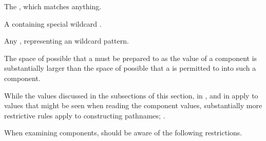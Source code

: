 \itemitem{\bull} The  , which matches anything.
 
\itemitem{\bull} A  containing  
		 special wildcard .
 
\itemitem{\bull} Any ,
		 representing an  wildcard pattern.

\endlist 

\endsubsubsection%


  
The space of possible  that a  
must be prepared to  
as the value of a  component
is substantially larger than the space of possible  
that a  is permitted to 
into such a component.

While the values discussed 
    in the subsections of this section,
    in {\secref\SpecialComponentValues},
and in {\secref\WildcardRestrictions} 
apply to values that might be seen when 
reading the component values,
substantially more restrictive rules apply to constructing pathnames;
\seesection\ConstructingPathnames.

When examining  components,
 should be aware of the following restrictions.

% 
%   
%   
%   
%   
%   
% 

